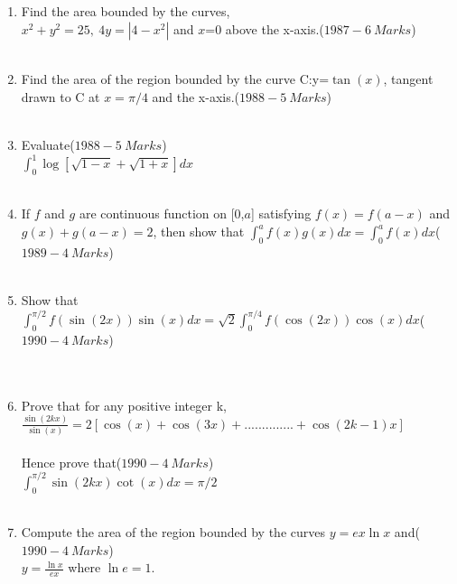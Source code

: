 \documentclass[journal,12pt,twocolumn]{IEEEtran}
\theoremstyle{remark}
\begin{document}
\begin{enumerate}
    \item Find the area bounded by the curves,\\ $x^2+y^2=25,\ 4y=|4-x^2|$ and $x$=0 above the x-axis.\hfill($1987-6\ Marks$)\\\\
    \item Find the area of the region bounded by the curve C:y=$\tan{(x)}$, tangent drawn to C at $x=\pi/4$ and the x-axis.\hfill($1988-5\ Marks$)\\\\
    \item Evaluate\hfill($1988-5\ Marks$)\\$\int_{0}^{1}\log[\sqrt{1-x}+\sqrt{1+x}]dx$\\\\
    \item If $f$ and $g$ are continuous function on [0,$a$] satisfying $f(x)=f(a-x)$ and\\$g(x)+g(a-x)=2$, then show that $\int_{0}^{a}f(x)g(x)dx = \int_{0}^{a}f(x)dx$\hfill($1989-4\ Marks$)\\\\
    \item Show that $\int_{0}^{\pi/2}f(\sin{(2x)})\sin{(x)}dx=\sqrt{2}\int_{0}^{\pi/4}f(\cos{(2x)})\cos{(x)}dx$\hfill($1990-4\ Marks$)\\\\\\
    \item Prove that for any positive integer k, $\frac{\sin{(2kx)}}{\sin{(x)}}=2[\cos{(x)}+\cos{(3x)}+..............+\cos{(2k-1)x}]$\\\\Hence prove that\hfill($1990-4\ Marks$)\\ $\int_{0}^{\pi/2}\sin{(2kx)}\cot{(x)}dx=\pi/2$\\\\
    \item Compute the area of the region bounded by the curves $y=ex\ln{x}$ and\hfill($1990-4\ Marks$)\\$y=\frac{\ln{x}}{ex}$ where $\ln{e}=1$.\\\\
    \end{enumerate}
    
\end{document}
